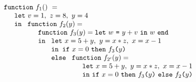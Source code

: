\begin{equation}
\label{FunctionalConstructionProgramLCUnrolled}
\begin{array}{l}
\texttt{function}\ f_1()\ = \\
  \quad
  \begin{array}{l}
     \texttt{let}\ v = 1, \ 
                   z = 8, \ 
                   y = 4\\
     \texttt{in}\ 
     \begin{array}[t]{l}
       \texttt{function}\ f_2(y) = \\
       \quad \begin{array}{l}  
               \texttt{function}\ f_3(y) = \letin w {y+v} w\\
               \texttt{in}\
               \begin{array}[t]{l}
                  \texttt{let}\ x = {5+y}, \
                                y = {x*z}, \
                                x = {x-1}\\ 
                  \texttt{in\ if}\ {x=0}\
                  \texttt{then}\ {\call {f_3} {y}}\\
                  \texttt{else}\
                   \begin{array}[t]{l}
                      \texttt{function}\ f_{2'}(y) = \\
                      \quad \begin{array}[t]{l}
                              \texttt{let}\ x = {5+y}, \
                                            y = {x*z}, \
                                            x = {x-1}\\ 
                              \texttt{in}\ 
                                \ite {x=0} {\call {f_3} {y}} {\call {f_2} {y}}\

\end{array}
\end{array}
\end{array}
\end{array}
\end{array}
\end{array}
\end{array}
\end{equation}
